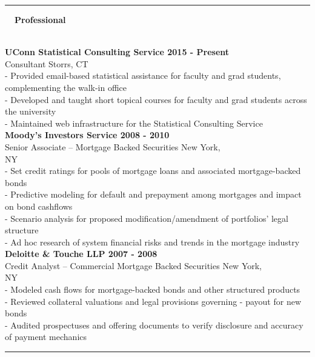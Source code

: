 \documentclass{article}
\begin{document}
\vspace{0.3cm}
\hrule
\vspace{0.3cm}
\begin{large}
\noindent
  \hspace{-0.9cm}
  \textbf{~~Professional}
  \vspace{0.1cm}
\end{large}\\
\noindent
\textbf{UConn Statistical Consulting Service \hfill 2015 - Present~~~~~~~~~~~~~~~}\\
Consultant \hfill Storrs, CT~~~~~~~~~~~~~~~~~~~~~~~~~\\
- Provided email-based statistical assistance for faculty and grad students, complementing the walk-in office\\
- Developed and taught short topical courses for faculty and grad students across the university\\
- Maintained web infrastructure for the Statistical Consulting Service
\vspace{0.25cm}
\\
\textbf{Moody’s Investors Service \hfill 2008 - 2010~~~~~~~~~~~~~~~~~~~}\\
Senior Associate – Mortgage Backed Securities \hfill New York, NY~~~~~~~~~~~~~~~~~~~~\\
- Set credit ratings for pools of mortgage loans and associated mortgage-backed bonds\\
- Predictive modeling for default and prepayment among mortgages and impact on bond cashflows\\
- Scenario analysis for proposed modification/amendment of portfolios' legal structure\\
- Ad hoc research of system financial risks and trends in the mortgage industry
\vspace{0.25cm}
\\
\textbf{Deloitte \& Touche LLP  \hfill 2007 - 2008~~~~~~~~~~~~~~~~~~~}\\
Credit Analyst – Commercial Mortgage Backed Securities \hfill New York, NY~~~~~~~~~~~~~~~~~~~~\\
- Modeled cash flows for mortgage-backed bonds and other structured products\\
- Reviewed collateral valuations and legal provisions governing - payout for new bonds\\
- Audited prospectuses and offering documents to verify disclosure and accuracy of payment mechanics
\vspace{0.3cm}
\hrule
\end{document}
